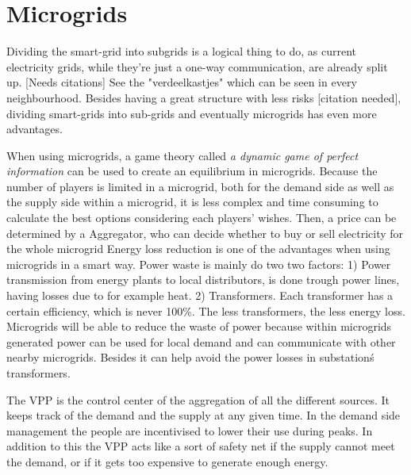 \section{Microgrids }
Dividing the smart-grid into subgrids is a logical thing to do, as current electricity grids, while they're just a one-way communication, are already split up. [Needs citations] See the "verdeelkastjes" which can be seen in every neighbourhood. Besides having a great structure with less risks [citation needed], dividing smart-grids into sub-grids and eventually microgrids  has even more advantages. 

When using microgrids, a game theory called \emph{a dynamic game of perfect information}  can be used to create an equilibrium in microgrids. Because the number of players is limited in a microgrid, both for the demand side as well as the supply side within a microgrid, it is less complex and time consuming to calculate the best options considering each players' wishes. Then, a price can be determined by a Aggregator, who can decide whether to buy or sell electricity for the whole microgrid \cite{MicrogridModellingPetrosAristidou}\linebreak \indent
Energy loss reduction is one of the advantages when using microgrids in a smart way. Power waste is mainly do two two factors\cite{EnergyLossURL}: 1) Power transmission from energy plants to local distributors, is done trough power lines, having losses due to for example heat. 2) Transformers. Each transformer has a certain efficiency, which is never 100\%. The less transformers, the less energy loss.\linebreak \indent
Microgrids will be able to reduce the waste of power because within microgrids generated power can be used for local demand and can communicate with other nearby microgrids. Besides it can help avoid the power losses in substation\'s transformers\cite{keypaper}.


The VPP is the control center of the aggregation of all the different sources. It keeps track of the demand and the supply at any given time. In the demand side management the people are incentivised to lower their use during peaks. In addition to this the VPP acts like a sort of safety net if the supply cannot meet the demand, or if it gets too expensive to generate enough energy. \cite{Kumagai2012}


